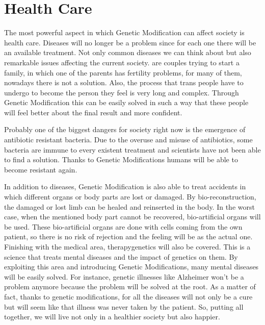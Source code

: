 \section*{Health Care}
\label{sec:health}
The most powerful aspect in which Genetic Modification can affect society is health care. Diseases will no longer be a problem since for each one there will be an available treatment. Not only common diseases we can think about but also remarkable issues affecting the current society. are couples trying to start a family, in which one of the parents has fertility problems, for many of them, nowadays there is not a solution. Also, the process that trans people have to undergo to become the person they feel is very long and complex. Through Genetic Modification this can be easily solved in such a way that these people will feel better about the final result and more confident. 

Probably one of the biggest dangers for society right now is the emergence of antibiotic resistant bacteria. Due to the overuse and misuse of antibiotics, some bacteria are immune to every existent treatment and scientists have not been able to find a solution. Thanks to Genetic Modifications humans will be able to become resistant again. 

In addition to diseases, Genetic Modification is also able to treat accidents in which different organs or body parts are lost or damaged. By bio-reconstruction, the damaged or lost limb can be healed and reinserted in the body. In the worst case, when the mentioned body part cannot be recovered, bio-artificial organs will be used. These bio-artificial organs are done with cells coming from the own patient, so there is no risk of rejection and the feeling will be as the actual one. Finishing with the medical area, therapygenetics will also be covered. This is a science that treats mental diseases and the impact of genetics on them. By exploiting this area and introducing Genetic Modifications, many mental diseases will be easily solved. For instance, genetic illnesses like Alzheimer won’t be a problem anymore because the problem will be solved at the root. As a matter of fact, thanks to genetic modifications, for all the diseases will not only be a cure but will seem like that illness was never taken by the patient. So, putting all together, we will live not only in a healthier society but also happier.

